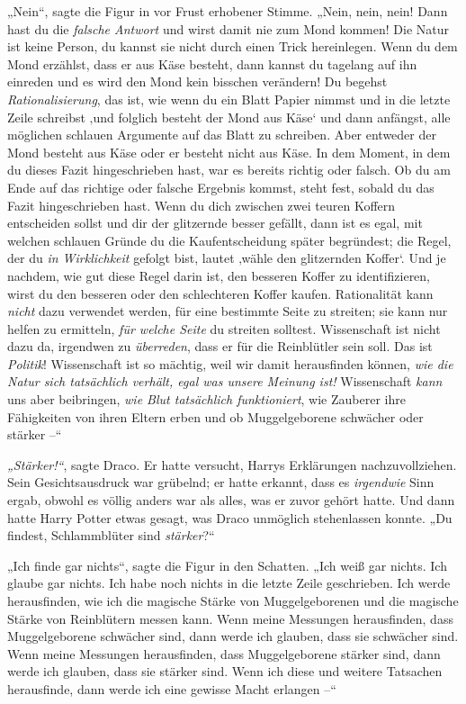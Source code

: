 „Nein“, sagte die Figur in vor Frust erhobener Stimme. „Nein, nein, nein! Dann hast du die \emph{falsche Antwort} und wirst damit nie zum Mond kommen! Die Natur ist keine Person, du kannst sie nicht durch einen Trick hereinlegen. Wenn du dem Mond erzählst, dass er aus Käse besteht, dann kannst du tagelang auf ihn einreden und es wird den Mond kein bisschen verändern! Du begehst \emph{Rationalisierung}, das ist, wie wenn du ein Blatt Papier nimmst und in die letzte Zeile schreibst ‚und folglich besteht der Mond aus Käse‘ und dann anfängst, alle möglichen schlauen Argumente auf das Blatt zu schreiben. Aber entweder der Mond besteht aus Käse oder er besteht nicht aus Käse. In dem Moment, in dem du dieses Fazit hingeschrieben hast, war es bereits richtig oder falsch. Ob du am Ende auf das richtige oder falsche Ergebnis kommst, steht fest, sobald du das Fazit hingeschrieben hast. Wenn du dich zwischen zwei teuren Koffern entscheiden sollst und dir der glitzernde besser gefällt, dann ist es egal, mit welchen schlauen Gründe du die Kaufentscheidung später begründest; die Regel, der du \emph{in Wirklichkeit} gefolgt bist, lautet ‚wähle den glitzernden Koffer‘. Und je nachdem, wie gut diese Regel darin ist, den besseren Koffer zu identifizieren, wirst du den besseren oder den schlechteren Koffer kaufen. Rationalität kann \emph{nicht} dazu verwendet werden, für eine bestimmte Seite zu streiten; sie kann nur helfen zu ermitteln, \emph{für welche Seite} du streiten solltest. Wissenschaft ist nicht dazu da, irgendwen zu \emph{überreden}, dass er für die Reinblütler sein soll. Das ist \emph{Politik}! Wissenschaft ist so mächtig, weil wir damit herausfinden können, \emph{wie die Natur sich tatsächlich verhält, egal was unsere Meinung ist!} Wissenschaft \emph{kann} uns aber beibringen, \emph{wie Blut tatsächlich funktioniert}, wie Zauberer ihre Fähigkeiten von ihren Eltern erben und ob Muggelgeborene schwächer oder stärker –“ 

\emph{„Stärker!“}, sagte Draco. Er hatte versucht, Harrys Erklärungen nachzuvollziehen. Sein Gesichtsausdruck war grübelnd; er hatte erkannt, dass es \emph{irgendwie} Sinn ergab, obwohl es völlig anders war als alles, was er zuvor gehört hatte. Und dann hatte Harry Potter etwas gesagt, was Draco unmöglich stehenlassen konnte. „Du findest, Schlammblüter sind \emph{stärker}?“ 

„Ich finde gar nichts“, sagte die Figur in den Schatten. „Ich weiß gar nichts. Ich glaube gar nichts. Ich habe noch nichts in die letzte Zeile geschrieben. Ich werde herausfinden, wie ich die magische Stärke von Muggelgeborenen und die magische Stärke von Reinblütern messen kann. Wenn meine Messungen herausfinden, dass Muggelgeborene schwächer sind, dann werde ich glauben, dass sie schwächer sind. Wenn meine Messungen herausfinden, dass Muggelgeborene stärker sind, dann werde ich glauben, dass sie stärker sind. Wenn ich diese und weitere Tatsachen herausfinde, dann werde ich eine gewisse Macht erlangen –“ 

